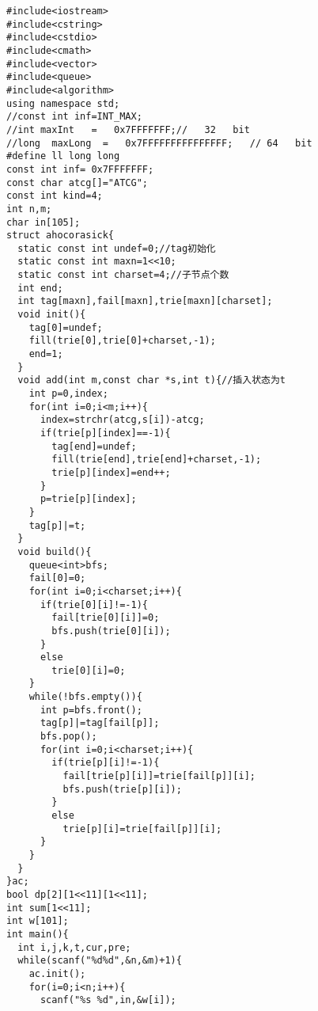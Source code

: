 \begin{lstlisting}[language={}]
#include<iostream>
#include<cstring>
#include<cstdio>
#include<cmath>
#include<vector>
#include<queue>
#include<algorithm>
using namespace std;
//const int inf=INT_MAX;
//int maxInt   =   0x7FFFFFFF;//   32   bit
//long  maxLong  =   0x7FFFFFFFFFFFFFFF;   // 64   bit
#define ll long long
const int inf= 0x7FFFFFFF;
const char atcg[]="ATCG";
const int kind=4;
int n,m;
char in[105];
struct ahocorasick{
  static const int undef=0;//tag初始化
  static const int maxn=1<<10;
  static const int charset=4;//子节点个数
  int end;
  int tag[maxn],fail[maxn],trie[maxn][charset];
  void init(){
    tag[0]=undef;
    fill(trie[0],trie[0]+charset,-1);
    end=1;
  }
  void add(int m,const char *s,int t){//插入状态为t
    int p=0,index;
    for(int i=0;i<m;i++){
      index=strchr(atcg,s[i])-atcg;
      if(trie[p][index]==-1){
        tag[end]=undef;
        fill(trie[end],trie[end]+charset,-1);
        trie[p][index]=end++;
      }
      p=trie[p][index];
    }
    tag[p]|=t;
  }
  void build(){
    queue<int>bfs;
    fail[0]=0;
    for(int i=0;i<charset;i++){
      if(trie[0][i]!=-1){
        fail[trie[0][i]]=0;
        bfs.push(trie[0][i]);
      }
      else
        trie[0][i]=0;
    }
    while(!bfs.empty()){
      int p=bfs.front();
      tag[p]|=tag[fail[p]];
      bfs.pop();
      for(int i=0;i<charset;i++){
        if(trie[p][i]!=-1){
          fail[trie[p][i]]=trie[fail[p]][i];
          bfs.push(trie[p][i]);
        }
        else
          trie[p][i]=trie[fail[p]][i];
      }
    }
  }
}ac;
bool dp[2][1<<11][1<<11];
int sum[1<<11];
int w[101];
int main(){
  int i,j,k,t,cur,pre;
  while(scanf("%d%d",&n,&m)+1){
    ac.init();
    for(i=0;i<n;i++){
      scanf("%s %d",in,&w[i]);

\end{lstlisting}
